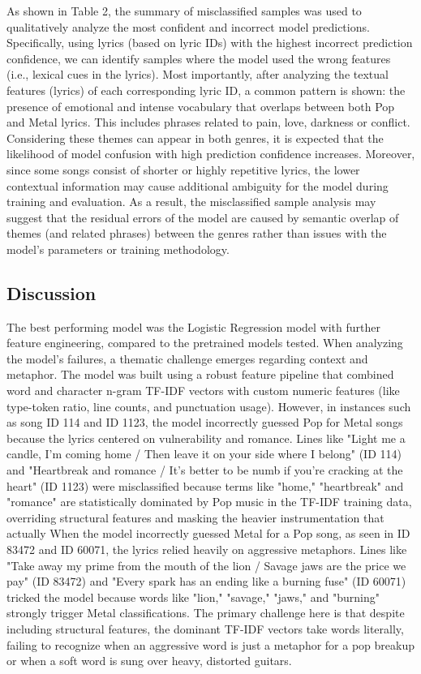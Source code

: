 As shown in Table 2, the summary of misclassified samples was used to qualitatively analyze the most confident and incorrect model predictions. Specifically, using lyrics (based on lyric IDs) with the highest incorrect prediction confidence, we can identify samples where the model used the wrong features (i.e., lexical cues in the lyrics). Most importantly, after analyzing the textual features (lyrics) of each corresponding lyric ID, a common pattern is shown: the presence of emotional and intense vocabulary that overlaps between both Pop and Metal lyrics. This includes phrases related to pain, love, darkness or conflict. Considering these themes can appear in both genres, it is expected that the likelihood of model confusion with high prediction confidence increases. Moreover, since some songs consist of shorter or highly repetitive lyrics, the lower contextual information may cause additional ambiguity for the model during training and evaluation. As a result, the misclassified sample analysis may suggest that the residual errors of the model are caused by semantic overlap of themes (and related phrases) between the genres rather than issues with the model's parameters or training methodology. 

\subsection{Discussion}
The best performing model was the Logistic Regression model with further feature engineering, compared to the pretrained models tested. When analyzing the model's failures, a thematic challenge emerges regarding context and metaphor. The model was built using a robust feature pipeline that combined word and character n-gram TF-IDF vectors with custom numeric features (like type-token ratio, line counts, and punctuation usage). However, in instances such as song ID 114 and ID 1123, the model incorrectly guessed Pop for Metal songs because the lyrics centered on vulnerability and romance. Lines like "Light me a candle, I'm coming home / Then leave it on your side where I belong" (ID 114) and "Heartbreak and romance / It's better to be numb if you're cracking at the heart" (ID 1123) were misclassified because terms like "home," "heartbreak" and "romance" are statistically dominated by Pop music in the TF-IDF training data, overriding structural features and masking the heavier instrumentation that actually When the model incorrectly guessed Metal for a Pop song, as seen in ID 83472 and ID 60071, the lyrics relied heavily on aggressive metaphors. Lines like "Take away my prime from the mouth of the lion / Savage jaws are the price we pay" (ID 83472) and "Every spark has an ending like a burning fuse" (ID 60071) tricked the model because words like "lion," "savage," "jaws," and "burning" strongly trigger Metal classifications. The primary challenge here is that despite including structural features, the dominant TF-IDF vectors take words literally, failing to recognize when an aggressive word is just a metaphor for a pop breakup or when a soft word is sung over heavy, distorted guitars.

